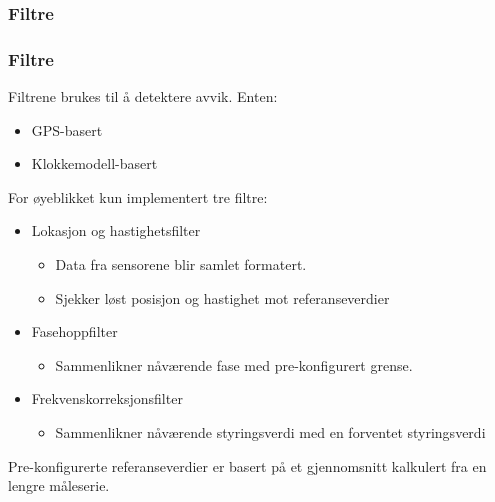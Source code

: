 \documentclass[xcolor=table]{beamer}
\begin{document}
\subsubsection{Filtre}
\begin{frame}
  \frametitle{Filtre}
  Filtrene brukes til å detektere avvik. Enten:
        \begin{itemize}
          \item GPS-basert
          \item Klokkemodell-basert
        \end{itemize}
  For øyeblikket kun implementert tre filtre:
  \begin{itemize}
    \item Lokasjon og hastighetsfilter
                  \begin{itemize}
                    \item Data fra sensorene blir samlet formatert.
                    \item Sjekker løst posisjon og hastighet mot referanseverdier
                  \end{itemize}
    \item Fasehoppfilter
                    \begin{itemize}
                      \item Sammenlikner nåværende fase med pre-konfigurert grense.
                    \end{itemize}
    \item Frekvenskorreksjonsfilter
                    \begin{itemize}
                      \item Sammenlikner nåværende styringsverdi med en forventet styringsverdi
                    \end{itemize}
  \end{itemize}
  Pre-konfigurerte referanseverdier er basert på et gjennomsnitt kalkulert fra en lengre måleserie.
\end{frame}
\end{document}
